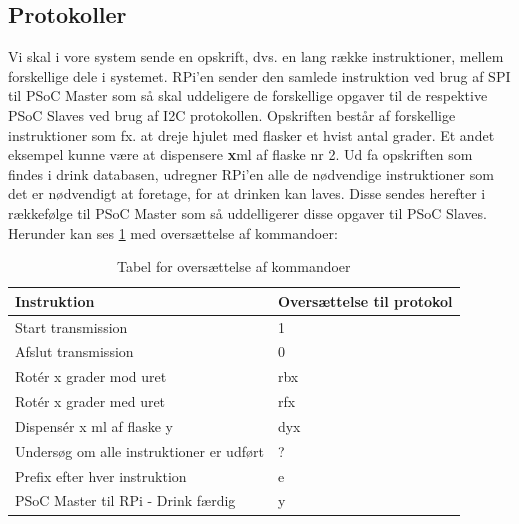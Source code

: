 \subsection{Protokoller}
Vi skal i vore system sende en opskrift, dvs. en lang række instruktioner, mellem forskellige dele i systemet. RPi'en sender den samlede instruktion ved brug af SPI til PSoC Master som så skal uddeligere de forskellige opgaver til de respektive PSoC Slaves ved brug af I2C protokollen. Opskriften består af forskellige instruktioner som fx. at dreje hjulet med flasker et hvist antal grader. Et andet eksempel kunne være at dispensere \textbf{x}ml af flaske nr 2. Ud fa opskriften som findes i drink databasen, udregner RPi'en alle de nødvendige instruktioner som det er nødvendigt at foretage, for at drinken kan laves. Disse sendes herefter i rækkefølge til PSoC Master som så uddelligerer disse opgaver til PSoC Slaves. Herunder kan ses \ref{tab:protokolTabel} med oversættelse af kommandoer:
\begin{table}[H]
\begin{tabular}{|l|l|}
\hline
Instruktion                              & Oversættelse til protokol \\ \hline
Start transmission                       & 1                         \\ \hline
Afslut transmission                      & 0                         \\ \hline
Rotér x grader mod uret                  & rbx                       \\ \hline
Rotér x grader med uret                  & rfx                       \\ \hline
Dispensér x ml af flaske y               & dyx                       \\ \hline
Undersøg om alle instruktioner er udført & ?                         \\ \hline
Prefix efter hver instruktion            & e                         \\ \hline
PSoC Master til RPi - Drink færdig       & y                         \\ \hline
\end{tabular}
\caption{Tabel for oversættelse af kommandoer}
\label{tab:protokolTabel}
\end{table}

